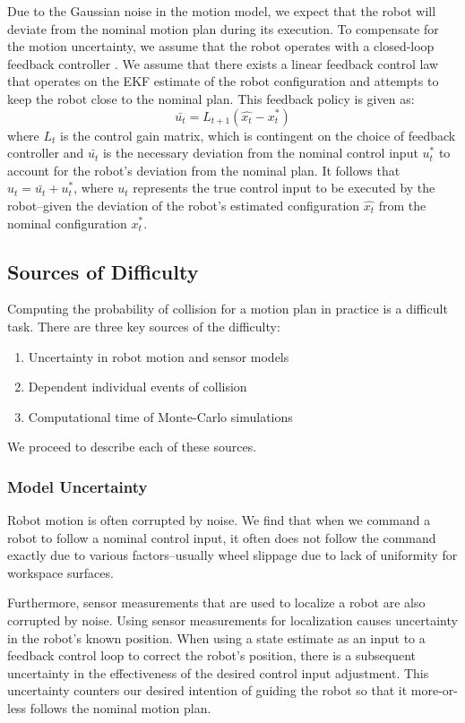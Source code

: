 \documentclass[journal]{IEEEtran}
\begin{document}
Due to the Gaussian noise in the motion model, we expect that the robot will deviate from the nominal motion plan during its execution. To compensate for the motion uncertainty, we assume that the robot operates with a closed-loop feedback controller \cite{IEEEhowto:stengel}. We assume that there exists a linear feedback control law that operates on the EKF estimate of the robot configuration and attempts to keep the robot close to the nominal plan. This feedback policy is given as:%
$$\bar{u_t} = L_{t+1}(\hat{x_t} - x_t^*) $$
where $L_{t}$ is the control gain matrix, which is contingent on the choice of feedback controller \cite{IEEEhowto:stengel} and $\bar{u_t}$ is the necessary deviation from the nominal control input $u_t^*$ to account for the robot's deviation from the nominal plan. It follows that $u_t = \bar{u_t} + u_t^*$, where $u_t$ represents the true control input to be executed by the robot--given the deviation of the robot's estimated configuration $\hat{x_t}$ from the nominal configuration $x_t^*$.

\subsection{Sources of Difficulty}
Computing the probability of collision for a motion plan in practice is a difficult task. There are three key sources of the difficulty:
\begin{enumerate}
\item Uncertainty in robot motion and sensor models
\item Dependent individual events of collision
\item Computational time of Monte-Carlo simulations
\end{enumerate}

We proceed to describe each of these sources.
\subsubsection{Model Uncertainty}
Robot motion is often corrupted by noise. We find that when we command a robot to follow a nominal control input, it often does not follow the command exactly due to various factors--usually wheel slippage due to lack of uniformity for workspace surfaces.

Furthermore, sensor measurements that are used to localize a robot are also corrupted by noise. Using sensor measurements for localization causes uncertainty in the robot's known position. When using a state estimate as an input to a feedback control loop to correct the robot's position, there is a subsequent uncertainty in the effectiveness of the desired control input adjustment. This uncertainty counters our desired intention of guiding the robot so that it more-or-less follows the nominal motion plan.
\end{document}
